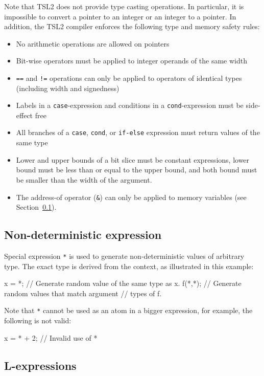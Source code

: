 \documentclass{report}
\newcommand{\src}[1]{\texttt{#1}}
\newcommand{\tsl}{TSL2 }
\begin{document}
Note that \tsl does not provide type casting operations.  In 
particular, it is impossible to convert a pointer to an integer or 
an integer to a pointer.  In addition, the \tsl compiler enforces the 
following type and memory safety rules:
\begin{itemize}
    \item No arithmetic operations are allowed on pointers
    \item Bit-wise operators must be applied to integer operands 
        of the same width
    \item \src{==} and \src{!=} operations can only be applied to 
        operators of identical types (including width and 
        signedness)
    \item Labels in a \src{case}-expression and conditions in a 
        \src{cond}-expression must be side-effect free
    \item All branches of a \src{case}, \src{cond}, or \src{if-else}
        expression must return values of the same type
    \item Lower and upper bounds of a bit slice must be constant 
        expressions, lower bound must be less than or equal to the 
        upper bound, and both bound must be smaller than the width
        of the argument.
    \item The address-of operator (\src{\&}) can only be applied 
        to memory variables (see Section~\ref{}).
\end{itemize}

\subsection{Non-deterministic expression}

Special expression \src{*} is used to generate non-deterministic 
values of arbitrary type.  The exact type is derived from the 
context, as illustrated in this example:
\begin{tsllisting}{}
x = *;  // Generate random value of the same type as x.
f(*,*); // Generate random values that match argument 
        // types of f.
\end{tsllisting}
Note that \src{*} cannot be used as an atom in a bigger expression,
for example, the following is not valid:
\begin{tsllisting}{}
x = * + 2; // Invalid use of *
\end{tsllisting}

\subsection{L-expressions}\label{s:r:lexpr}
\end{document}
